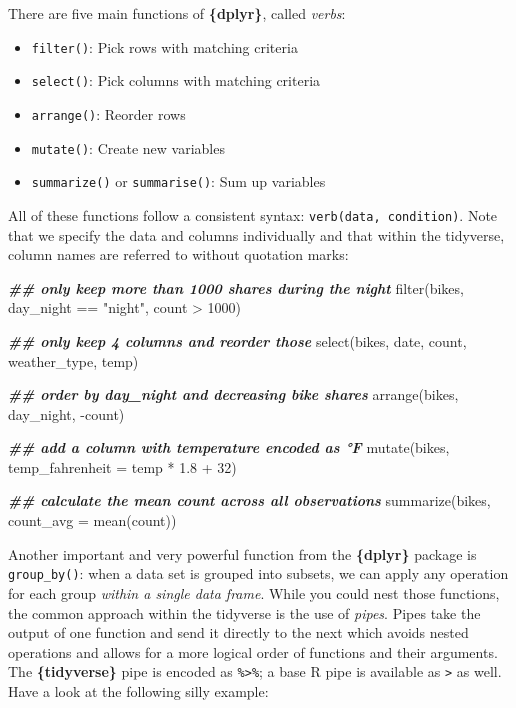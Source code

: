 \documentclass[
]{krantz}
\makeatletter
\newenvironment{Shaded}{\begin{snugshade}}{\end{snugshade}}
\newcommand{\AttributeTok}[1]{\textcolor[rgb]{0.61,0.61,0.61}{#1}}
\newcommand{\DecValTok}[1]{\textcolor[rgb]{0.06,0.06,0.06}{#1}}
\newcommand{\DocumentationTok}[1]{\textcolor[rgb]{0.37,0.37,0.37}{\textbf{\textit{#1}}}}
\newcommand{\FloatTok}[1]{\textcolor[rgb]{0.06,0.06,0.06}{#1}}
\newcommand{\FunctionTok}[1]{\textcolor[rgb]{0,0,0}{#1}}
\newcommand{\NormalTok}[1]{#1}
\newcommand{\SpecialCharTok}[1]{\textcolor[rgb]{0,0,0}{#1}}
\newcommand{\StringTok}[1]{\textcolor[rgb]{0.5,0.5,0.5}{#1}}
\providecommand{\tightlist}{%
  \setlength{\itemsep}{0pt}\setlength{\parskip}{0pt}}
\newenvironment{kframe}{%
\medskip{}
\setlength{\fboxsep}{.8em}
 \def\at@end@of@kframe{}%
 \ifinner\ifhmode%
  \def\at@end@of@kframe{\end{minipage}}%
  \begin{minipage}{\columnwidth}%
 \fi\fi%
 \def\FrameCommand##1{\hskip\@totalleftmargin \hskip-\fboxsep
 \colorbox{shadecolor}{##1}\hskip-\fboxsep
     \hskip-\linewidth \hskip-\@totalleftmargin \hskip\columnwidth}%
 \MakeFramed {\advance\hsize-\width
   \@totalleftmargin\z@ \linewidth\hsize
   \@setminipage}}%
 {\par\unskip\endMakeFramed%
 \at@end@of@kframe}
\renewenvironment{Shaded}{\begin{kframe}}{\end{kframe}}
\makeatother
\begin{document}
There are five main functions of \textbf{\{dplyr\}}, called \emph{verbs}:

\begin{itemize}
\tightlist
\item
  \texttt{filter()}: Pick rows with matching criteria
\item
  \texttt{select()}: Pick columns with matching criteria
\item
  \texttt{arrange()}: Reorder rows
\item
  \texttt{mutate()}: Create new variables
\item
  \texttt{summarize()} or \texttt{summarise()}: Sum up variables
\end{itemize}

All of these functions follow a consistent syntax: \texttt{verb(data,\ condition)}. Note that we specify the data and columns individually and that within the tidyverse, column names are referred to without quotation marks:

\begin{Shaded}
\begin{Highlighting}[]
\DocumentationTok{\#\# only keep more than 1000 shares during the night}
\FunctionTok{filter}\NormalTok{(bikes, day\_night }\SpecialCharTok{==} \StringTok{"night"}\NormalTok{, count }\SpecialCharTok{\textgreater{}} \DecValTok{1000}\NormalTok{) }

\DocumentationTok{\#\# only keep 4 columns and reorder those}
\FunctionTok{select}\NormalTok{(bikes, date, count, weather\_type, temp) }

\DocumentationTok{\#\# order by day\_night and decreasing bike shares}
\FunctionTok{arrange}\NormalTok{(bikes, day\_night, }\SpecialCharTok{{-}}\NormalTok{count) }

\DocumentationTok{\#\# add a column with temperature encoded as °F}
\FunctionTok{mutate}\NormalTok{(bikes, }\AttributeTok{temp\_fahrenheit =}\NormalTok{ temp }\SpecialCharTok{*} \FloatTok{1.8} \SpecialCharTok{+} \DecValTok{32}\NormalTok{)}

\DocumentationTok{\#\# calculate the mean count across all observations}
\FunctionTok{summarize}\NormalTok{(bikes, }\AttributeTok{count\_avg =} \FunctionTok{mean}\NormalTok{(count)) }
\end{Highlighting}
\end{Shaded}

Another important and very powerful function from the \textbf{\{dplyr\}} package is \texttt{group\_by()}: when a data set is grouped into subsets, we can apply any operation for each group \emph{within a single data frame}. While you could nest those functions, the common approach within the tidyverse is the use of \emph{pipes}. Pipes take the output of one function and send it directly to the next which avoids nested operations and allows for a more logical order of functions and their arguments. The \textbf{\{tidyverse\}} pipe is encoded as \texttt{\%\textgreater{}\%}; a base R pipe is available as \texttt{\textbar{}\textgreater{}} as well. Have a look at the following silly example:
\end{document}
